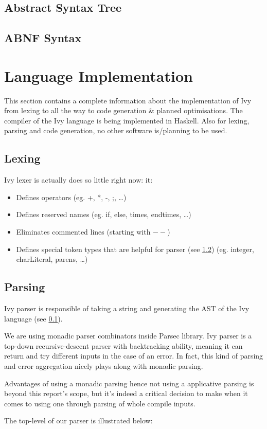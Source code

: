 \documentclass{article}
\begin{document}
\subsection{Abstract Syntax Tree}
\label{subsec:ast}

\subsection{ABNF Syntax}
\label{subsec:abnf_syntax}

\section{Language Implementation}
This section contains a complete information about the implementation of Ivy from lexing to all the way to code generation \& planned optimisations.
The compiler of the Ivy language is being implemented in Haskell. Also for lexing, parsing and code generation, no other software is/planning to be used.
\subsection{Lexing}
\label{subsec:lexing}
Ivy lexer is actually does so little right now: it:
\begin{itemize}
  \item Defines operators (eg. +, *, -, ;, \ldots)
  \item Defines reserved names (eg. if, else, times, endtimes, \ldots)
  \item Eliminates commented lines (starting with $--$)
  \item Defines special token types that are helpful for parser (see \ref{subsec:parsing}) (eg. integer, charLiteral, parens, \ldots)
\end{itemize}
\newpage
\subsection{Parsing}
\label{subsec:parsing}
Ivy parser is responsible of taking a string and generating the AST of the Ivy language (see \ref{subsec:ast}).
\par We are using monadic parser combinators inside Parsec library. Ivy parser is a top-down recursive-descent parser with backtracking ability, meaning it can return and try different inputs in the case of an error. In fact, this kind of parsing and error aggregation nicely plays along with monadic parsing.
\par Advantages of using a monadic parsing hence not using a applicative parsing is beyond this report's scope, but it's indeed a critical decision to make when it comes to using one through parsing of whole compile inputs.
\par The top-level of our parser is illustrated below:

\end{document}
